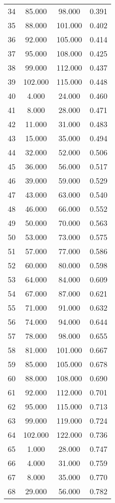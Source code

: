 \begin{tabular}{cccc}
  34 & 85.000 & 98.000 & 0.391 \\ 
  35 & 88.000 & 101.000 & 0.402 \\ 
  36 & 92.000 & 105.000 & 0.414 \\ 
  37 & 95.000 & 108.000 & 0.425 \\ 
  38 & 99.000 & 112.000 & 0.437 \\ 
  39 & 102.000 & 115.000 & 0.448 \\ 
  40 & 4.000 & 24.000 & 0.460 \\ 
  41 & 8.000 & 28.000 & 0.471 \\ 
  42 & 11.000 & 31.000 & 0.483 \\ 
  43 & 15.000 & 35.000 & 0.494 \\ 
  44 & 32.000 & 52.000 & 0.506 \\ 
  45 & 36.000 & 56.000 & 0.517 \\ 
  46 & 39.000 & 59.000 & 0.529 \\ 
  47 & 43.000 & 63.000 & 0.540 \\ 
  48 & 46.000 & 66.000 & 0.552 \\ 
  49 & 50.000 & 70.000 & 0.563 \\ 
  50 & 53.000 & 73.000 & 0.575 \\ 
  51 & 57.000 & 77.000 & 0.586 \\ 
  52 & 60.000 & 80.000 & 0.598 \\ 
  53 & 64.000 & 84.000 & 0.609 \\ 
  54 & 67.000 & 87.000 & 0.621 \\ 
  55 & 71.000 & 91.000 & 0.632 \\ 
  56 & 74.000 & 94.000 & 0.644 \\ 
  57 & 78.000 & 98.000 & 0.655 \\ 
  58 & 81.000 & 101.000 & 0.667 \\ 
  59 & 85.000 & 105.000 & 0.678 \\ 
  60 & 88.000 & 108.000 & 0.690 \\ 
  61 & 92.000 & 112.000 & 0.701 \\ 
  62 & 95.000 & 115.000 & 0.713 \\ 
  63 & 99.000 & 119.000 & 0.724 \\ 
  64 & 102.000 & 122.000 & 0.736 \\ 
  65 & 1.000 & 28.000 & 0.747 \\ 
  66 & 4.000 & 31.000 & 0.759 \\ 
  67 & 8.000 & 35.000 & 0.770 \\ 
  68 & 29.000 & 56.000 & 0.782 \\ 

\end{tabular}
